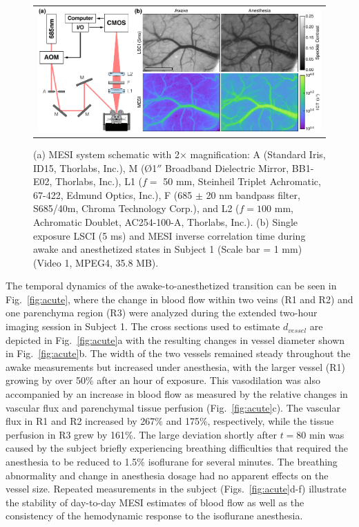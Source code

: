 \documentclass[12pt]{spieman}
\begin{document}
\begin{spacing}{2}
\begin{figure}
    \begin{center}
        \begin{tabular}{c}
            \includegraphics[width=6.25in]{Figure1.pdf}
        \end{tabular}
    \end{center}
    \caption {
        \label{fig:system_image}
        (a) MESI system schematic with 2$\times$ magnification: A (Standard Iris, ID15, Thorlabs, Inc.), M ({{\O}}1$''$ Broadband Dielectric Mirror, BB1-E02, Thorlabs, Inc.), L1 ($f =$ 50 mm, Steinheil Triplet Achromatic, 67-422, Edmund Optics, Inc.), F (685 $\pm$ 20 nm bandpass filter, S685/40m, Chroma Technology Corp.), and L2 ($f = 100$ mm, Achromatic Doublet, AC254-100-A, Thorlabs, Inc.). (b) Single exposure LSCI (5 ms) and MESI inverse correlation time during awake and anesthetized states in Subject 1 (Scale bar = 1 mm) (Video 1, MPEG4, 35.8 MB).
    }
\end{figure}

The temporal dynamics of the awake-to-anesthetized transition can be seen in Fig.~\ref{fig:acute}, where the change in blood flow within two veins (R1 and R2) and one parenchyma region (R3) were analyzed during the extended two-hour imaging session in Subject 1. The cross sections used to estimate $d_{vessel}$ are depicted in Fig.~\ref{fig:acute}a with the resulting changes in vessel diameter shown in Fig.~\ref{fig:acute}b. The width of the two vessels remained steady throughout the awake measurements but increased under anesthesia, with the larger vessel (R1) growing by over 50\% after an hour of exposure. This vasodilation was also accompanied by an increase in blood flow as measured by the relative changes in vascular flux and parenchymal tissue perfusion (Fig.~\ref{fig:acute}c). The vascular flux in R1 and R2 increased by 267\% and 175\%, respectively, while the tissue perfusion in R3 grew by 161\%. The large deviation shortly after $t = 80$ min was caused by the subject briefly experiencing breathing difficulties that required the anesthesia to be reduced to 1.5\% isoflurane for several minutes. The breathing abnormality and change in anesthesia dosage had no apparent effects on the vessel size. Repeated measurements in the subject (Figs.~\ref{fig:acute}d-f) illustrate the stability of day-to-day MESI estimates of blood flow as well as the consistency of the hemodynamic response to the isoflurane anesthesia.


\end{spacing}
\end{document}
